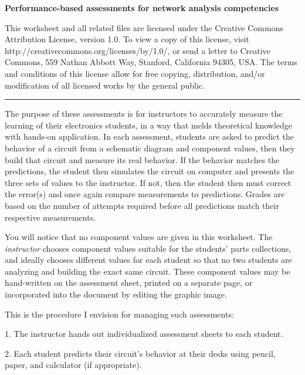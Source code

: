 
\centerline{\bf Performance-based assessments for network analysis competencies} \bigskip 
 
This worksheet and all related files are licensed under the Creative Commons Attribution License, version 1.0.  To view a copy of this license, visit http://creativecommons.org/licenses/by/1.0/, or send a letter to Creative Commons, 559 Nathan Abbott Way, Stanford, California 94305, USA.  The terms and conditions of this license allow for free copying, distribution, and/or modification of all licensed works by the general public.

\bigskip 

\hrule

\vskip 10pt

The purpose of these assessments is for instructors to accurately measure the learning of their electronics students, in a way that melds theoretical knowledge with hands-on application.  In each assessment, students are asked to predict the behavior of a circuit from a schematic diagram and component values, then they build that circuit and measure its real behavior.  If the behavior matches the predictions, the student then simulates the circuit on computer and presents the three sets of values to the instructor.  If not, then the student then must correct the error(s) and once again compare measurements to predictions.  Grades are based on the number of attempts required before all predictions match their respective measurements.

You will notice that no component values are given in this worksheet.  The {\it instructor} chooses component values suitable for the students' parts collections, and ideally chooses different values for each student so that no two students are analyzing and building the exact same circuit.  These component values may be hand-written on the assessment sheet, printed on a separate page, or incorporated into the document by editing the graphic image.

\vskip 10pt

\noindent
This is the procedure I envision for managing such assessments:

\vskip 10pt

\item{1.} The instructor hands out individualized assessment sheets to each student.

\item{2.} Each student predicts their circuit's behavior at their desks using pencil, paper, and calculator (if appropriate).

